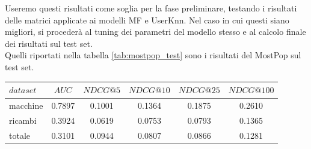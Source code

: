 Useremo questi risultati come soglia per la fase preliminare, testando i risultati delle matrici applicate ai modelli MF e UserKnn. Nel caso in cui questi siano migliori, si procederà al tuning dei parametri del modello stesso e al calcolo finale dei risultati sul test set.\\
Quelli riportati nella tabella \ref{tab:mostpop_test} sono i risultati del MostPop sul test set.\\
\begin{center}
\begin{tabular}{|l|c|cccc|}
    \toprule
    $dataset$ &    $AUC$ &  $NDCG@5$ & $NDCG@10$  & $NDCG@25$ & $NDCG@100$  \\
    \midrule
    macchine & 0.7897 & 0.1001 &  0.1364 &  0.1875 & 0.2610 \\
    ricambi  & 0.3924 & 0.0619 &  0.0753 &  0.0793 & 0.1365 \\
    totale   & 0.3101 & 0.0944 &  0.0807 &  0.0866 & 0.1281 \\
\bottomrule
\end{tabular}
\label{tab:mostpop_test}
\end{center}

